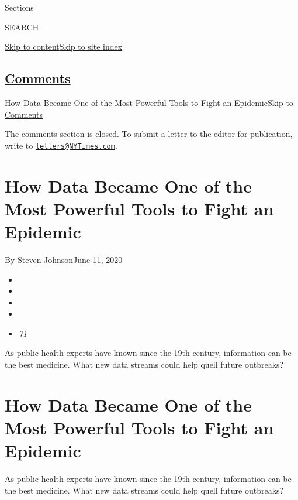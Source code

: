 Sections

SEARCH

\protect\hyperlink{site-content}{Skip to
content}\protect\hyperlink{site-index}{Skip to site index}

\hypertarget{comments}{%
\subsection{\texorpdfstring{\protect\hyperlink{commentsContainer}{Comments}}{Comments}}\label{comments}}

\href{}{How Data Became One of the Most Powerful Tools to Fight an
Epidemic}\href{}{Skip to Comments}

The comments section is closed. To submit a letter to the editor for
publication, write to
\href{mailto:letters@NYTimes.com}{\nolinkurl{letters@NYTimes.com}}.

\hypertarget{how-data-became-one-of-the-most-powerful-tools-to-fight-an-epidemic}{%
\section{How Data Became One of the Most Powerful Tools to Fight an
Epidemic}\label{how-data-became-one-of-the-most-powerful-tools-to-fight-an-epidemic}}

By Steven JohnsonJune 11, 2020

\begin{itemize}
\item
\item
\item
\item
\item
  \emph{71}
\end{itemize}

As public-health experts have known since the 19th century, information
can be the best medicine. What new data streams could help quell future
outbreaks?

\hypertarget{how-data-became-one-of-the-most-powerful-tools-to-fight-an-epidemic-1}{%
\section{How Data Became One of the Most Powerful Tools to Fight an
Epidemic}\label{how-data-became-one-of-the-most-powerful-tools-to-fight-an-epidemic-1}}

As public-health experts have known since the 19th century, information
can be the best medicine. What new data streams could help quell future
outbreaks?

